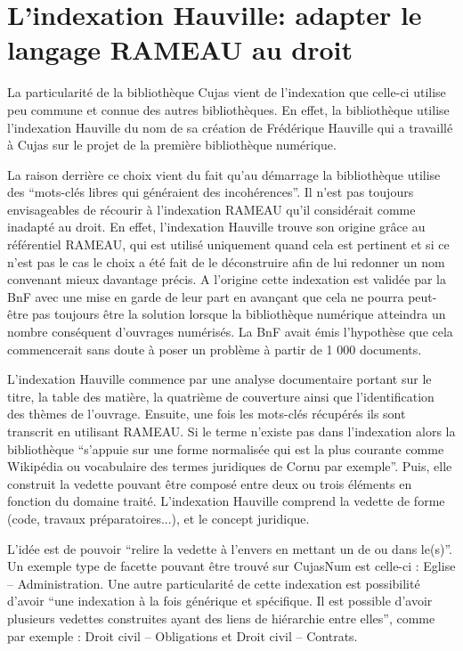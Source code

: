 \section[Hauville]{L’indexation Hauville: adapter le langage RAMEAU au droit}

La particularité de la bibliothèque Cujas vient de l'indexation que celle-ci utilise peu commune et connue des autres bibliothèques. En effet, la bibliothèque utilise l'indexation Hauville du nom de sa création de Frédérique Hauville qui a travaillé à Cujas sur le projet de la première bibliothèque numérique. 

La raison derrière ce choix vient du fait qu'au démarrage la bibliothèque utilise des \enquote{mots-clés libres qui généraient des incohérences}. Il n'est pas toujours envisageables de récourir à l'indexation RAMEAU qu'il considérait comme inadapté au droit. En effet, l'indexation Hauville trouve son origine grâce au référentiel RAMEAU, qui est utilisé uniquement quand cela est pertinent et si ce n'est pas le cas le choix a été fait de le déconstruire afin de lui redonner un nom convenant mieux davantage précis. A l'origine cette indexation est validée par la BnF avec une mise en garde de leur part en avançant que cela ne pourra peut-être pas toujours être la solution lorsque la bibliothèque numérique atteindra un nombre conséquent d'ouvrages numérisés. La BnF avait émis l'hypothèse que cela commencerait sans doute à poser un problème à partir de 1 000 documents. 

L'indexation Hauville commence par une analyse documentaire portant sur le titre, la table des matière, la quatrième de couverture ainsi que l'identification des thèmes de l'ouvrage. Ensuite, une fois les mots-clés récupérés ils sont transcrit en utilisant RAMEAU. Si le terme n'existe pas dans l'indexation alors la bibliothèque \enquote{s'appuie sur une forme normalisée qui est la plus courante comme Wikipédia ou vocabulaire des termes juridiques de Cornu par exemple}. Puis, elle construit la vedette pouvant être composé entre deux ou trois éléments en fonction du domaine traité. L'indexation Hauville comprend la vedette de forme (code, travaux préparatoires...), et le concept juridique. 

L'idée est de pouvoir \enquote{relire la vedette à l'envers en mettant un de ou dans le(s)}. Un exemple type de facette pouvant être trouvé sur CujasNum est celle-ci : Eglise -- Administration. Une autre particularité de cette indexation est possibilité d'avoir \enquote{une indexation à la fois générique et spécifique. Il est possible d'avoir plusieurs vedettes construites ayant des liens de hiérarchie entre elles}, comme par exemple : Droit civil -- Obligations et Droit civil -- Contrats.

